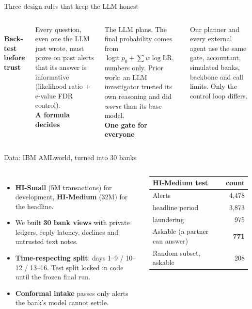 \documentclass[aspectratio=169,11pt]{beamer}
\newcommand{\bignum}[2]{{\color{#1}\fontsize{30}{32}\selectfont\bfseries #2}}
\begin{document}
\begin{frame}{Three design rules that keep the LLM honest}
\begin{columns}[t]
\centering\bignum{accent}{1}\\[2pt]\textbf{Back-test before trust}\\[4pt]
\raggedright\small Every question, even one the LLM just wrote, must prove on past alerts that its answer is informative (likelihood ratio + e-value FDR control).
\centering\bignum{accent}{2}\\[2pt]\textbf{A formula decides}\\[4pt]
\raggedright\small The LLM plans. The final probability comes from $\operatorname{logit} p_0 + \sum w \log \mathrm{LR}$, numbers only. Prior work: an LLM investigator trusted its own reasoning and did \emph{worse} than its base model.
\centering\bignum{accent}{3}\\[2pt]\textbf{One gate for everyone}\\[4pt]
\raggedright\small Our planner and every external agent use the same gate, accountant, simulated banks, backbone and call limits. Only the control loop differs.
\end{columns}
\end{frame}

\begin{frame}{Data: IBM AMLworld, turned into 30 banks}
\begin{columns}[c]
\begin{itemize}
\item \textbf{HI-Small} (5M transactions) for development, \textbf{HI-Medium} (32M) for the headline.
\item We built \textbf{30 bank views} with private ledgers, reply latency, declines and untrusted text notes.
\item \textbf{Time-respecting split}: days 1--9 / 10--12 / 13--16. Test split locked in code until the frozen final run.
\item \textbf{Conformal intake} passes only alerts the bank's model cannot settle.
\end{itemize}
\centering
\begin{tabular}{lr}
\toprule
HI-Medium test & count \\
\midrule
Alerts & 4,478 \\
\quad headline period & 3,873 \\
\quad laundering & 975 \\
\alert{Askable} (a partner can answer) & \alert{\textbf{771}} \\
Random subset, askable & 208 \\
\bottomrule
\end{tabular}
\end{columns}
\end{frame}
\end{document}
